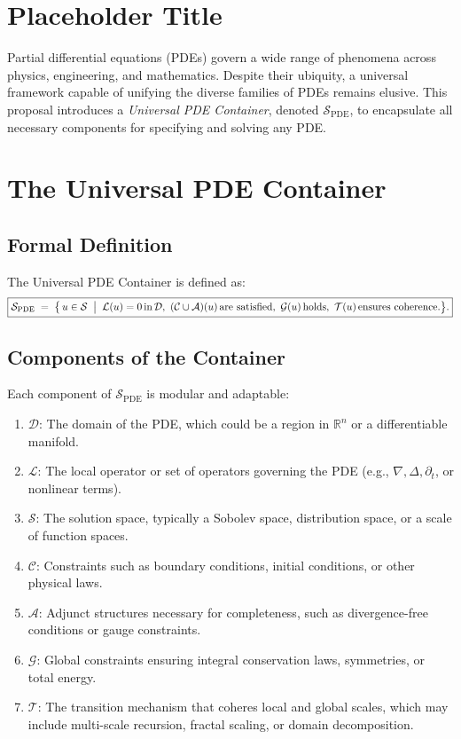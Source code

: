 \section{Placeholder Title}
Partial differential equations (PDEs) govern a wide range of phenomena across physics, engineering, and mathematics. Despite their ubiquity, a universal framework capable of unifying the diverse families of PDEs remains elusive. This proposal introduces a \textit{Universal PDE Container}, denoted \(\mathcal{S}_{\text{PDE}}\), to encapsulate all necessary components for specifying and solving any PDE.

\section{The Universal PDE Container}
\subsection{Formal Definition}
The Universal PDE Container is defined as:
\[
\boxed{
\mathcal{S}_{\text{PDE}}
\;=\;
\bigl\{
\,u \in \mathcal{S}
\;\bigm|\;
\mathcal{L}(u) = 0\,\text{in}\,\mathcal{D},\
(\mathcal{C} \cup \mathcal{A})(u)\,\text{are satisfied},\
\mathcal{G}(u)\,\text{holds},\
\mathcal{T}(u)\,\text{ensures coherence.}
\bigr\}
.}
\]

\subsection{Components of the Container}
Each component of \(\mathcal{S}_{\text{PDE}}\) is modular and adaptable:
\begin{enumerate}
    \item \(\mathcal{D}\): The domain of the PDE, which could be a region in \(\mathbb{R}^n\) or a differentiable manifold.
    \item \(\mathcal{L}\): The local operator or set of operators governing the PDE (e.g., \(\nabla, \Delta, \partial_t\), or nonlinear terms).
    \item \(\mathcal{S}\): The solution space, typically a Sobolev space, distribution space, or a scale of function spaces.
    \item \(\mathcal{C}\): Constraints such as boundary conditions, initial conditions, or other physical laws.
    \item \(\mathcal{A}\): Adjunct structures necessary for completeness, such as divergence-free conditions or gauge constraints.
    \item \(\mathcal{G}\): Global constraints ensuring integral conservation laws, symmetries, or total energy.
    \item \(\mathcal{T}\): The transition mechanism that coheres local and global scales, which may include multi-scale recursion, fractal scaling, or domain decomposition.
\end{enumerate}

